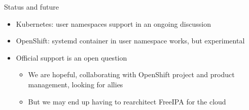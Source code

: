 \documentclass[ignorenonframetext,aspectratio=169,12pt]{beamer}
\begin{document}
\begin{frame}{Status and future}
\protect\hypertarget{future}{}

\begin{itemize}
\item Kubernetes: user namespaces support in an ongoing discussion
\item OpenShift: systemd container in user namespace works, but experimental
\item Official support is an open question
    \begin{itemize}
    \item We are hopeful, collaborating with OpenShift project and
      product management, looking for allies
    \item But we may end up having to rearchitect FreeIPA for the cloud
    \end{itemize}
\end{itemize}

\end{frame}
\end{document}
